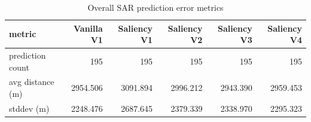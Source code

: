\begin{table}[ht]
\centering
\caption{Overall SAR prediction error metrics}
\label{tab:sar-overall-errors}
\begin{tabular}{lrrrrr}
\hline
metric & Vanilla V1 & Saliency V1 & Saliency V2 & Saliency V3 & Saliency V4 \\
\hline
prediction count & 195 & 195 & 195 & 195 & 195 \\
avg distance (m) & 2954.506 & 3091.894 & 2996.212 & 2943.390 & 2959.453 \\
stddev (m) & 2248.476 & 2687.645 & 2379.339 & 2338.970 & 2295.323 \\
\hline
\end{tabular}
\end{table}
